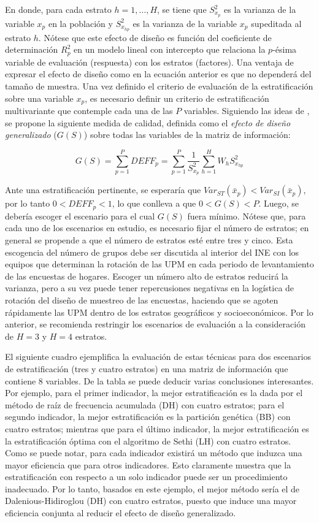 \documentclass[
  12pt,
  spanish,
]{book}
\begin{document}
En donde, para cada estrato \(h = 1, \ldots, H\), se tiene que \(S^2_{x_p}\) es la varianza de la variable \(x_p\) en la población y \(S^2_{x_{hp}}\) es la varianza de la variable \(x_p\) supeditada al estrato \(h\). Nótese que este efecto de diseño es función del coeficiente de determinación \(R^2_p\) en un modelo lineal con intercepto que relaciona la \(p\)-ésima variable de evaluación (respuesta) con los estratos (factores). Una ventaja de expresar el efecto de diseño como en la ecuación anterior es que no dependerá del tamaño de muestra. Una vez definido el criterio de evaluación de la estratificación sobre una variable \(x_p\), es necesario definir un criterio de estratificación multivariante que contemple cada una de las \(P\) variables. Siguiendo las ideas de \citet{Jarque_1981}, se propone la siguiente medida de calidad, definida como el \emph{efecto de diseño generalizado} (\(G(S)\)) sobre todas las variables de la matriz de información:

\[
G(S) = \sum_{p=1}^P DEFF_p = \sum_{p=1}^P \frac{1}{S^2_{x_p}}\sum_{h=1}^H W_h S^2_{x_{hp}}
\]

Ante una estratificación pertinente, se esperaría que \(Var_{ST}(\bar x _p) < Var_{SI}(\bar x _p)\), por lo tanto \(0 < DEFF_p < 1\), lo que conlleva a que \(0 < G(S) < P\). Luego, se debería escoger el escenario para el cual \(G(S)\) fuera mínimo. Nótese que, para cada uno de los escenarios en estudio, es necesario fijar el número de estratos; en general se propende a que el número de estratos esté entre tres y cinco. Esta escogencia del número de grupos debe ser discutida al interior del INE con los equipos que determinan la rotación de las UPM en cada periodo de levantamiento de las encuestas de hogares. Escoger un número alto de estratos reducirá la varianza, pero a su vez puede tener repercusiones negativas en la logística de rotación del diseño de muestreo de las encuestas, haciendo que se agoten rápidamente las UPM dentro de los estratos geográficos y socioeconómicos. Por lo anterior, se recomienda restringir los escenarios de evaluación a la consideración de \(H=3\) y \(H=4\) estratos.

El siguiente cuadro ejemplifica la evaluación de estas técnicas para dos escenarios de estratificación (tres y cuatro estratos) en una matriz de información que contiene 8 variables. De la tabla se puede deducir varias conclusiones interesantes. Por ejemplo, para el primer indicador, la mejor estratificación es la dada por el método de raíz de frecuencia acumulada (DH) con cuatro estratos; para el segundo indicador, la mejor estratificación es la partición genética (BB) con cuatro estratos; mientras que para el último indicador, la mejor estratificación es la estratificación óptima con el algoritmo de Sethi (LH) con cuatro estratos. Como se puede notar, para cada indicador existirá un método que induzca una mayor eficiencia que para otros indicadores. Esto claramente muestra que la estratificación con respecto a un solo indicador puede ser un procedimiento inadecuado. Por lo tanto, basados en este ejemplo, el mejor método sería el de Dalenious-Hidiroglou (DH) con cuatro estratos, puesto que induce una mayor eficiencia conjunta al reducir el efecto de diseño generalizado.
\end{document}
